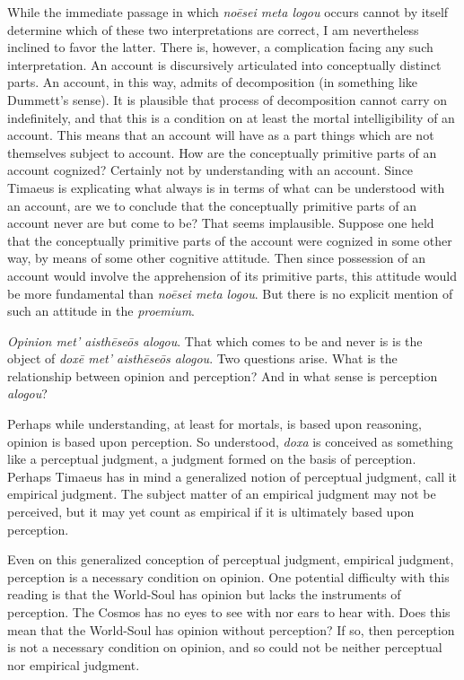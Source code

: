 While the immediate passage in which \emph{noēsei meta logou} occurs cannot by itself determine which of these two interpretations are correct, I am nevertheless inclined to favor the latter. There is, however, a complication facing any such interpretation. An account is discursively articulated into conceptually distinct parts. An account, in this way, admits of decomposition (in something like Dummett's \citeyear{dummett73} sense). It is plausible that process of decomposition cannot carry on indefinitely, and that this is a condition on at least the mortal intelligibility of an account. This means that an account will have as a part things which are not themselves subject to account. How are the conceptually primitive parts of an account cognized? Certainly not by understanding with an account. Since Timaeus is explicating what always is in terms of what can be understood with an account, are we to conclude that the conceptually primitive parts of an account never are but come to be? That seems implausible. Suppose one held that the conceptually primitive parts of the account were cognized in some other way, by means of some other cognitive attitude. Then since possession of an account would involve the apprehension of its primitive parts, this attitude would be more fundamental than \emph{noēsei meta logou}. But there is no explicit mention of such an attitude in the \emph{proemium}.

\emph{Opinion \emph{met' aisthēseōs alogou}}. That which comes to be and never is is the object of \emph{doxē met' aisthēseōs alogou}. Two questions arise. What is the relationship between opinion and perception? And in what sense is perception \emph{alogou}? 

Perhaps while understanding, at least for mortals, is based upon reasoning, opinion is based upon perception. So understood, \emph{doxa} is conceived as something like a perceptual judgment, a judgment formed on the basis of perception. Perhaps Timaeus has in mind a generalized notion of perceptual judgment, call it empirical judgment. The subject matter of an empirical judgment may not be perceived, but it may yet count as empirical if it is ultimately based upon perception. 

Even on this generalized conception of perceptual judgment, empirical judgment, perception is a necessary condition on opinion. One potential difficulty with this reading is that the World-Soul has opinion but lacks the instruments of perception. The Cosmos has no eyes to see with nor ears to hear with. Does this mean that the World-Soul has opinion without perception? If so, then perception is not a necessary condition on opinion, and so could not be neither perceptual nor empirical judgment.


